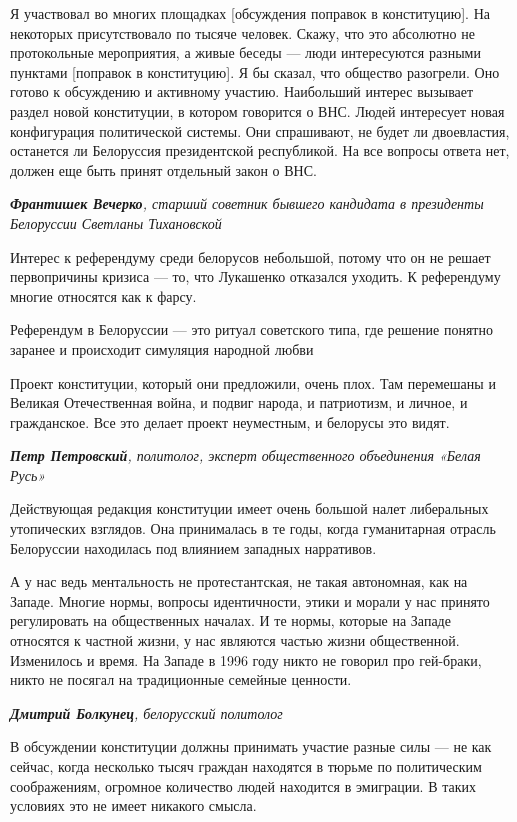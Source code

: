 Я участвовал во многих площадках [обсуждения поправок в конституцию]. На некоторых присутствовало по тысяче человек. Скажу, что это абсолютно не протокольные мероприятия, а живые беседы — люди интересуются разными пунктами [поправок в конституцию]. Я бы сказал, что общество разогрели. Оно готово к обсуждению и активному участию. Наибольший интерес вызывает раздел новой конституции, в котором говорится о ВНС. Людей интересует новая конфигурация политической системы. Они спрашивают, не будет ли двоевластия, останется ли Белоруссия президентской республикой. На все вопросы ответа нет, должен еще быть принят отдельный закон о ВНС.

\textit{\textbf{Франтишек Вечерко}, старший советник бывшего кандидата в президенты Белоруссии Светланы Тихановской}

Интерес к референдуму среди белорусов небольшой, потому что он не решает первопричины кризиса — то, что Лукашенко отказался уходить. К референдуму многие относятся как к фарсу.

\begin{fancyquotes}
    Референдум в Белоруссии — это ритуал советского типа, где решение понятно заранее и происходит симуляция народной любви
\end{fancyquotes}

Проект конституции, который они предложили, очень плох. Там перемешаны и Великая Отечественная война, и подвиг народа, и патриотизм, и личное, и гражданское. Все это делает проект неуместным, и белорусы это видят.

\textit{\textbf{Петр Петровский}, политолог, эксперт общественного объединения «Белая Русь»}

Действующая редакция конституции имеет очень большой налет либеральных утопических взглядов. Она принималась в те годы, когда гуманитарная отрасль Белоруссии находилась под влиянием западных нарративов.

А у нас ведь ментальность не протестантская, не такая автономная, как на Западе. Многие нормы, вопросы идентичности, этики и морали у нас принято регулировать на общественных началах. И те нормы, которые на Западе относятся к частной жизни, у нас являются частью жизни общественной. Изменилось и время. На Западе в 1996 году никто не говорил про гей-браки, никто не посягал на традиционные семейные ценности.

\textit{\textbf{Дмитрий Болкунец}, белорусский политолог}

В обсуждении конституции должны принимать участие разные силы — не как сейчас, когда несколько тысяч граждан находятся в тюрьме по политическим соображениям, огромное количество людей находится в эмиграции. В таких условиях это не имеет никакого смысла.

